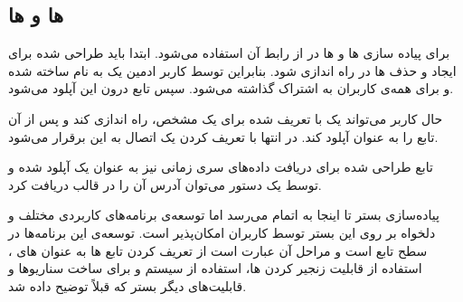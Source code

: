 \subsection{ ها و  ها}

برای پیاده سازی  ها و  ها در  از رابط  آن استفاده می‌شود. ابتدا باید  طراحی شده برای ایجاد و حذف  ها در  راه اندازی شود. بنابراین توسط کاربر ادمین  یک  به نام  ساخته شده و برای همه‌ی کاربران به اشتراک گذاشته می‌شود. سپس تابع  درون این  آپلود می‌شود.

حال کاربر می‌تواند یک  با  تعریف شده برای یک  مشخص، راه اندازی کند و پس از آن تابع  را به عنوان  آپلود کند. در انتها با تعریف کردن یک  اتصال  به این  برقرار می‌شود.

تابع طراحی شده برای دریافت داده‌های سری زمانی نیز به عنوان یک  آپلود شده و توسط یک دستور  می‌توان آدرس آن را در قالب  دریافت کرد.
\newline

پیاده‌سازی بستر تا اینجا به اتمام می‌رسد اما توسعه‌ی برنامه‌های کاربردی مختلف و دلخواه بر روی این بستر توسط کاربران امکان‌پذیر است. توسعه‌ی این برنامه‌ها در سطح تابع است و مراحل آن عبارت است از تعریف کردن تابع ها به عنوان  های ، استفاده از قابلیت زنجیر کردن  ها، استفاده از سیستم  و  برای ساخت سناریوها و قابلیت‌های دیگر بستر که قبلاً توضیح داده شد.
